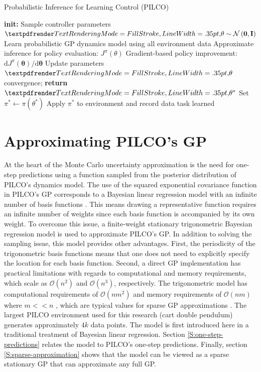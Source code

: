 \begin{algorithm}
\caption{Probabilistic Inference for Learning Control (PILCO)}\label{PILCO:algorithm-1}
\begin{algorithmic}[1]
\State \textbf{init:} Sample controller parameters $\boldgreek{\theta} \sim \mathcal{N}\left(\mathbf{0},\mathbf{I}\right)$
\Repeat{}
\State Learn probabilistic GP dynamics model using all environment data 
\Repeat{}
\State Approximate inference for policy evaluation: $J^{\pi}\left(\theta\right)$ 
\State Gradient-based policy improvement: $\mathrm{d} J^{\pi}(\boldsymbol{\theta}) / \mathrm{d} \boldsymbol{\theta}$ 
\State Update parameters $\boldgreek{\theta}$
\Until convergence; \textbf{return} $\boldgreek{\theta}^{*}$
\State Set $\pi^{*} \gets \pi\left(\theta^{*}\right)$
\State  Apply $\pi^{*}$ to environment and record data
\Until task learned 
\end{algorithmic}
\end{algorithm}

\section{Approximating PILCO's GP}
\label{S:approximating-pilcos-gp}
At the heart of the Monte Carlo uncertainty approximation is the need for one-step predictions using a function sampled from the posterior distribution of PILCO's dynamics model. The use of the squared exponential covariance function in PILCO's GP corresponds to a Bayesian linear regression model with an infinite number of basis functions \citep{williams2006gaussian}. This means drawing a representative function requires an infinite number of weights since each basis function is accompanied by its own weight. To overcome this issue, a finite-weight stationary trigonometric Bayesian regression model \citep{quia2010sparse} is used to approximate PILCO's GP. In addition to solving the sampling issue, this model provides other advantages. First, the periodicity of the trigonometric basis functions means that one does not need to explicitly specify the location for each basis function. Second, a direct GP implementation has practical limitations with regards to computational and memory requirements, which scale as $\mathcal{O}(n^{2})$ and $\mathcal{O}(n^{3})$, respectively. The trigonometric model has computational requirements of $\mathcal{O}(nm^{2})$ and memory requirements of $\mathcal{O}(nm)$ where $m<<n$ \citep{quia2010sparse}, which are typical values for sparse GP approximations \citep{quinonero2005unifying}. The largest PILCO environment used for this research (cart double pendulum) generates approximately $4k$ data points. The model is first introduced here in a traditional treatment of Bayesian linear regression. Section \ref{S:one-step-predictions} relates the model to PILCO's one-step predictions. Finally, section \ref{S:sparse-approximation} shows that the model can be viewed as a sparse stationary GP that can approximate any full GP.

